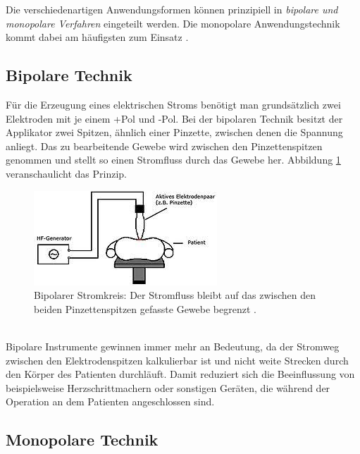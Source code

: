 \documentclass[letterpaper,12pt]{article}
\begin{document}
		Die verschiedenartigen Anwendungsformen können prinzipiell in \emph{bipolare und monopolare Verfahren} eingeteilt werden. Die monopolare Anwendungstechnik kommt dabei am häufigsten zum Einsatz \cite{kramme2016medizintechnik}.
		
		\subsection{Bipolare Technik}
		
			Für die Erzeugung eines elektrischen Stroms benötigt man grundsätzlich zwei Elektroden mit je einem +Pol und -Pol. Bei der bipolaren Technik besitzt der Applikator zwei Spitzen, ähnlich einer Pinzette, zwischen denen die Spannung anliegt. Das zu bearbeitende Gewebe wird zwischen den Pinzettenspitzen genommen und stellt so einen Stromfluss durch das Gewebe her. Abbildung \ref{fig:bipolareTechnik2} veranschaulicht das Prinzip.
			\begin{figure}[ht] 
				\centering
				\includegraphics[width=0.35\columnwidth]{images/_bipolareTechnik.png}
				\caption{		 
					Bipolarer Stromkreis: Der Stromfluss bleibt auf das zwischen den beiden Pinzettenspitzen gefasste Gewebe begrenzt \cite{wiki:HF}.}
				\label{fig:bipolareTechnik2}
			\end{figure}\\
			Bipolare Instrumente gewinnen immer mehr an Bedeutung, da der Stromweg zwischen den Elektrodenspitzen kalkulierbar ist und nicht weite Strecken durch den Körper des Patienten durchläuft. Damit reduziert sich die Beeinflussung von beispielsweise Herzschrittmachern oder sonstigen Geräten, die während der Operation an dem Patienten angeschlossen sind.
		
		\subsection{Monopolare Technik}
		
\end{document}
